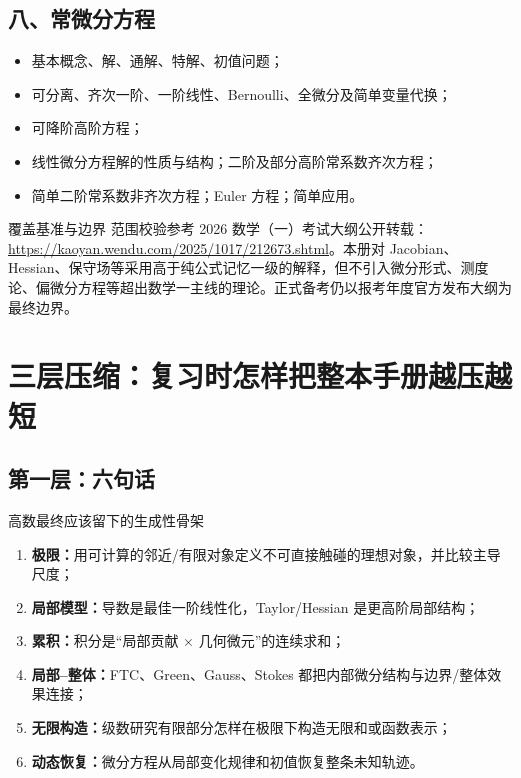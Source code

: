 \documentclass[11pt,a4paper,openany]{ctexbook}
\newcommand{\key}[1]{\textbf{\color{deep}#1}}
\begin{document}
\section*{八、常微分方程}
\begin{itemize}
  \item 基本概念、解、通解、特解、初值问题；
  \item 可分离、齐次一阶、一阶线性、Bernoulli、全微分及简单变量代换；
  \item 可降阶高阶方程；
  \item 线性微分方程解的性质与结构；二阶及部分高阶常系数齐次方程；
  \item 简单二阶常系数非齐次方程；Euler 方程；简单应用。
\end{itemize}

\begin{methodbox}{覆盖基准与边界}
范围校验参考 2026 数学（一）考试大纲公开转载：\url{https://kaoyan.wendu.com/2025/1017/212673.shtml}。本册对 Jacobian、Hessian、保守场等采用高于纯公式记忆一级的解释，但不引入微分形式、测度论、偏微分方程等超出数学一主线的理论。正式备考仍以报考年度官方发布大纲为最终边界。
\end{methodbox}

\chapter{三层压缩：复习时怎样把整本手册越压越短}

\section{第一层：六句话}
\begin{corebox}{高数最终应该留下的生成性骨架}
\begin{enumerate}
  \item \key{极限：}用可计算的邻近/有限对象定义不可直接触碰的理想对象，并比较主导尺度；
  \item \key{局部模型：}导数是最佳一阶线性化，Taylor/Hessian 是更高阶局部结构；
  \item \key{累积：}积分是“局部贡献 $\times$ 几何微元”的连续求和；
  \item \key{局部--整体：}FTC、Green、Gauss、Stokes 都把内部微分结构与边界/整体效果连接；
  \item \key{无限构造：}级数研究有限部分怎样在极限下构造无限和或函数表示；
  \item \key{动态恢复：}微分方程从局部变化规律和初值恢复整条未知轨迹。
\end{enumerate}
\end{corebox}
\end{document}
